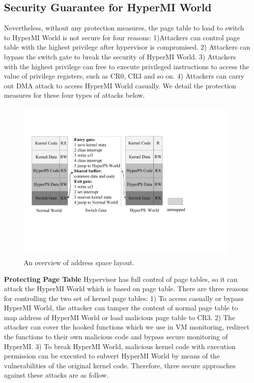 \documentclass[conference]{IEEEtran}
\begin{document}
\subsection{Security Guarantee for HyperMI World}\label {SG}
Nevertheless, without any protection measures, the page table to load to switch to HyperMI World is not secure for four reasons: 1)Attackers can control page table with the highest privilege after hypervisor is compromised. 2) Attackers can bypass the switch gate to break the security of HyperMI World. 3) Attackers with the highest privilege can free to execute privileged instructions to access the value of privilege registers, such as CR0, CR3 and so on. 4) Attackers can carry out DMA attack to access HyperMI World casually.
We detail the protection measures for these four types of attacks below.

\begin{figure}
\centerline{\includegraphics[width=11cm, height=8cm]{pdfvmcs2.pdf}}%
\caption{An overview of address space layout.} \label{fig2}
\end{figure}

\textbf{Protecting Page Table}
Hypervisor has full control of page tables, so it can attack the HyperMI World which is based on page table.
There are three reasons for controlling the two set of kernel page tables: 1) To access casually or bypass HyperMI World, the attacker can tamper the content of normal page table to map address of HyperMI World or load malicious page table to CR3.
2) The attacker can cover the hooked functions which we use in VM monitoring, redirect the functions to their own malicious code and bypass secure monitoring of HyperMI. 3) To break HyperMI World, malicious kernel code with execution permission can be executed to subvert HyperMI World by means of the vulnerabilities of the original kernel code. 
Therefore, three secure approaches against these attacks are as follow.
\end{document}

